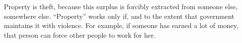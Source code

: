 Property is theft, because this surplus is forcibly extracted from someone else, somewhere else.
``Property'' works only if, and to the extent that government maintains it with violence.
For example, if someone has earned a lot of money, that person can force other people to work for her.